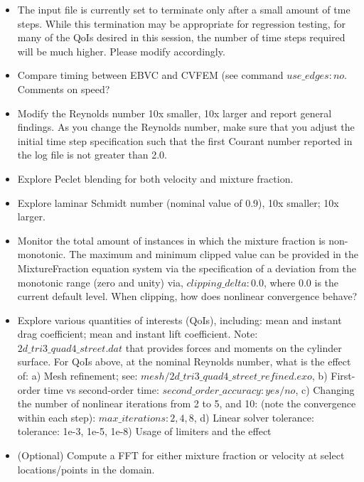 \documentclass{article}
\begin{document}
\begin{itemize}
	\item The input file is currently set to terminate only after a small amount of tme steps. While this
              termination may be appropriate for regression testing, for many of the QoIs desired in this
              session, the number of time steps required will be much higher. Please modify accordingly.
	\item Compare timing between EBVC and CVFEM (see command $use\_edges: no$. Comments on speed?
        \item Modify the Reynolds number 10x smaller, 10x larger and report general findings. 
          As you change the Reynolds number, make sure that you adjust the initial time step 
          specification such that the first Courant number reported in the log file is not greater 
          than 2.0.
        \item Explore Peclet blending for both velocity and mixture fraction.
        \item Explore laminar Schmidt number (nominal value of 0.9), 10x smaller; 10x larger.
        \item Monitor the total amount of instances in which the mixture fraction is non-monotonic.
          \subitem The maximum and minimum clipped value can be provided in the MixtureFraction
          equation system via the specification of a deviation from the monotonic range (zero and unity)
          via, $clipping\_delta: 0.0$, where $0.0$ is the current default level. When clipping, how does nonlinear 
          convergence behave?
        \item Explore various quantities of interests (QoIs), including: mean and instant drag 
          coefficient; mean and instant lift coefficient. 
        \subitem Note: $2d\_tri3\_quad4\_street.dat$ 
          that provides forces and moments on the cylinder surface. For QoIs above, at the nominal 
          Reynolds number, what is the effect of: a) Mesh refinement; see: 
          $mesh/2d\_tri3\_quad4\_street\_refined.exo$, b) First-order time vs second-order time: 
          $second\_order\_accuracy: yes/no$, c) Changing the number of nonlinear iterations from 2 to 5, 
          and 10: (note the convergence within each step): $max\_iterations: 2, 4, 8$, d) Linear solver 
          tolerance: tolerance: 1e-3, 1e-5, 1e-8) Usage of limiters and the effect
        \item (Optional) Compute a FFT for either mixture fraction or velocity at select locations/points in the domain. 
\end{itemize}
\end{document}

